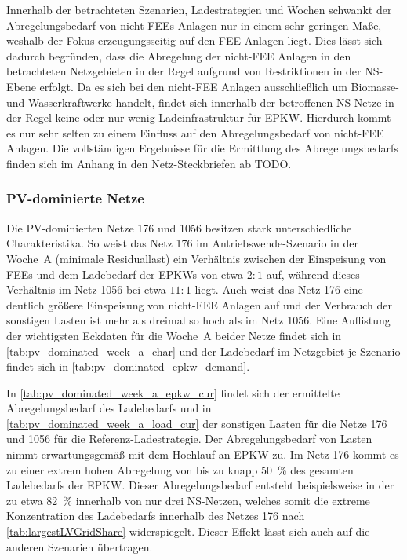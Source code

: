 

Innerhalb der betrachteten Szenarien, Ladestrategien und Wochen schwankt der Abregelungsbedarf von nicht-\glspl{FEE} Anlagen nur in einem sehr geringen Maße, weshalb der Fokus erzeugungsseitig auf den \gls{FEE} Anlagen liegt.
Dies lässt sich dadurch begründen, dass die Abregelung der nicht-\gls{FEE} Anlagen in den betrachteten Netzgebieten in der Regel aufgrund von Restriktionen in der \gls{NS}-Ebene erfolgt.
Da es sich bei den nicht-\gls{FEE} Anlagen ausschließlich um Biomasse- und Wasserkraftwerke handelt, findet sich innerhalb der betroffenen \gls{NS}-Netze in der Regel keine oder nur wenig Ladeinfrastruktur für \gls{EPKW}.
Hierdurch kommt es nur sehr selten zu einem Einfluss auf den Abregelungsbedarf von nicht-\gls{FEE} Anlagen.
Die vollständigen Ergebnisse für die Ermittlung des Abregelungsbedarfs finden sich im Anhang in den Netz-Steckbriefen ab {\color{red} TODO}.


\subsubsection{PV-dominierte Netze}

Die \gls{PV}-dominierten Netze \num{176} und \num{1056} besitzen stark unterschiedliche Charakteristika.
So weist das Netz \num{176} im Antriebswende-Szenario in der Woche~A (minimale Residuallast) ein Verhältnis zwischen der Einspeisung von \glspl{FEE} und dem Ladebedarf der \glspl{EPKW} von etwa \(2:1\) auf, während dieses Verhältnis im Netz \num{1056} bei etwa \(11:1\) liegt.
Auch weist das Netz \num{176} eine deutlich größere Einspeisung von nicht-\gls{FEE} Anlagen auf und der Verbrauch der sonstigen Lasten ist mehr als dreimal so hoch als im Netz \num{1056}.
Eine Auflistung der wichtigsten Eckdaten für die Woche~A beider Netze findet sich in \autoref{tab:pv_dominated_week_a_char} und der Ladebedarf im Netzgebiet je Szenario findet sich in \autoref{tab:pv_dominated_epkw_demand}.





In \autoref{tab:pv_dominated_week_a_epkw_cur} findet sich der ermittelte Abregelungsbedarf des Ladebedarfs und in \autoref{tab:pv_dominated_week_a_load_cur} der sonstigen Lasten für die Netze \num{176} und \num{1056} für die Referenz-Ladestrategie.
Der Abregelungsbedarf von Lasten nimmt erwartungsgemäß mit dem Hochlauf an \gls{EPKW} zu.
Im Netz \num{176} kommt es zu einer extrem hohen Abregelung von bis zu knapp \SI{50}{\percent} des gesamten Ladebedarfs der \gls{EPKW}.
Dieser Abregelungsbedarf entsteht beispielsweise in der \SzeFirmenparkplatz zu etwa \SI{82}{\percent} innerhalb von nur drei \gls{NS}-Netzen, welches somit die extreme Konzentration des Ladebedarfs innerhalb des Netzes \num{176} nach \autoref{tab:largestLVGridShare} widerspiegelt.
Dieser Effekt lässt sich auch auf die anderen Szenarien übertragen.\medskip

